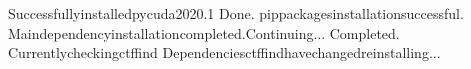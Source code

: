 \documentclass[a4paper,11pt,english]{sphinxmanual}
\begin{document}
\begin{sphinxVerbatim}[commandchars=\\\{\}]
Successfullyinstalledpycuda\PYGZhy{}2020.1
\PYGZhy{}\PYGZhy{}\PYGZhy{}\PYGZhy{}\PYGZhy{}\PYGZhy{}\PYGZhy{}\PYGZhy{}\PYGZhy{}\PYGZhy{}\PYGZhy{}\PYGZhy{}\PYGZhy{}\PYGZhy{}\PYGZhy{}\PYGZhy{}\PYGZhy{}\PYGZhy{}\PYGZhy{}\PYGZhy{}\PYGZhy{}\PYGZhy{}\PYGZhy{}\PYGZhy{}\PYGZhy{}\PYGZhy{}\PYGZhy{}\PYGZhy{}\PYGZhy{}\PYGZhy{}\PYGZhy{}\PYGZhy{}\PYGZhy{}\PYGZhy{}\PYGZhy{}\PYGZhy{}\PYGZhy{}\PYGZhy{}\PYGZhy{}\PYGZhy{}\PYGZhy{}\PYGZhy{}\PYGZhy{}\PYGZhy{}\PYGZhy{}\PYGZhy{}\PYGZhy{}\PYGZhy{}\PYGZhy{}\PYGZhy{}\PYGZhy{}\PYGZhy{}\PYGZhy{}\PYGZhy{}\PYGZhy{}\PYGZhy{}\PYGZhy{}\PYGZhy{}\PYGZhy{}\PYGZhy{}\PYGZhy{}\PYGZhy{}\PYGZhy{}\PYGZhy{}\PYGZhy{}\PYGZhy{}\PYGZhy{}\PYGZhy{}\PYGZhy{}\PYGZhy{}\PYGZhy{}\PYGZhy{}
Done.
pippackagesinstallationsuccessful.
\PYGZhy{}\PYGZhy{}\PYGZhy{}\PYGZhy{}\PYGZhy{}\PYGZhy{}\PYGZhy{}\PYGZhy{}\PYGZhy{}\PYGZhy{}\PYGZhy{}\PYGZhy{}\PYGZhy{}\PYGZhy{}\PYGZhy{}\PYGZhy{}\PYGZhy{}\PYGZhy{}\PYGZhy{}\PYGZhy{}\PYGZhy{}\PYGZhy{}\PYGZhy{}\PYGZhy{}\PYGZhy{}\PYGZhy{}\PYGZhy{}\PYGZhy{}\PYGZhy{}\PYGZhy{}\PYGZhy{}\PYGZhy{}\PYGZhy{}\PYGZhy{}\PYGZhy{}\PYGZhy{}\PYGZhy{}\PYGZhy{}\PYGZhy{}\PYGZhy{}\PYGZhy{}\PYGZhy{}\PYGZhy{}\PYGZhy{}\PYGZhy{}\PYGZhy{}\PYGZhy{}\PYGZhy{}\PYGZhy{}\PYGZhy{}\PYGZhy{}\PYGZhy{}\PYGZhy{}\PYGZhy{}\PYGZhy{}\PYGZhy{}\PYGZhy{}\PYGZhy{}\PYGZhy{}\PYGZhy{}\PYGZhy{}\PYGZhy{}\PYGZhy{}\PYGZhy{}\PYGZhy{}\PYGZhy{}\PYGZhy{}\PYGZhy{}\PYGZhy{}\PYGZhy{}\PYGZhy{}\PYGZhy{}
Maindependencyinstallationcompleted.Continuing...
\PYGZhy{}\PYGZhy{}\PYGZhy{}\PYGZhy{}\PYGZhy{}\PYGZhy{}\PYGZhy{}\PYGZhy{}\PYGZhy{}\PYGZhy{}\PYGZhy{}\PYGZhy{}\PYGZhy{}\PYGZhy{}\PYGZhy{}\PYGZhy{}\PYGZhy{}\PYGZhy{}\PYGZhy{}\PYGZhy{}\PYGZhy{}\PYGZhy{}\PYGZhy{}\PYGZhy{}\PYGZhy{}\PYGZhy{}\PYGZhy{}\PYGZhy{}\PYGZhy{}\PYGZhy{}\PYGZhy{}\PYGZhy{}\PYGZhy{}\PYGZhy{}\PYGZhy{}\PYGZhy{}\PYGZhy{}\PYGZhy{}\PYGZhy{}\PYGZhy{}\PYGZhy{}\PYGZhy{}\PYGZhy{}\PYGZhy{}\PYGZhy{}\PYGZhy{}\PYGZhy{}\PYGZhy{}\PYGZhy{}\PYGZhy{}\PYGZhy{}\PYGZhy{}\PYGZhy{}\PYGZhy{}\PYGZhy{}\PYGZhy{}\PYGZhy{}\PYGZhy{}\PYGZhy{}\PYGZhy{}\PYGZhy{}\PYGZhy{}\PYGZhy{}\PYGZhy{}\PYGZhy{}\PYGZhy{}\PYGZhy{}\PYGZhy{}\PYGZhy{}\PYGZhy{}\PYGZhy{}\PYGZhy{}
Completed.
Currentlycheckingctffind
Dependenciesctffindhavechanged\PYGZhy{}reinstalling...
\PYGZhy{}\PYGZhy{}\PYGZhy{}\PYGZhy{}\PYGZhy{}\PYGZhy{}\PYGZhy{}\PYGZhy{}\PYGZhy{}\PYGZhy{}\PYGZhy{}\PYGZhy{}\PYGZhy{}\PYGZhy{}\PYGZhy{}\PYGZhy{}\PYGZhy{}\PYGZhy{}\PYGZhy{}\PYGZhy{}\PYGZhy{}\PYGZhy{}\PYGZhy{}\PYGZhy{}\PYGZhy{}\PYGZhy{}\PYGZhy{}\PYGZhy{}\PYGZhy{}\PYGZhy{}\PYGZhy{}\PYGZhy{}\PYGZhy{}\PYGZhy{}\PYGZhy{}\PYGZhy{}\PYGZhy{}\PYGZhy{}\PYGZhy{}\PYGZhy{}\PYGZhy{}\PYGZhy{}\PYGZhy{}\PYGZhy{}\PYGZhy{}\PYGZhy{}\PYGZhy{}\PYGZhy{}\PYGZhy{}\PYGZhy{}\PYGZhy{}\PYGZhy{}\PYGZhy{}\PYGZhy{}\PYGZhy{}\PYGZhy{}\PYGZhy{}\PYGZhy{}\PYGZhy{}\PYGZhy{}\PYGZhy{}\PYGZhy{}\PYGZhy{}\PYGZhy{}\PYGZhy{}\PYGZhy{}\PYGZhy{}\PYGZhy{}\PYGZhy{}\PYGZhy{}\PYGZhy{}\PYGZhy{}

\end{sphinxVerbatim}
\end{document}
